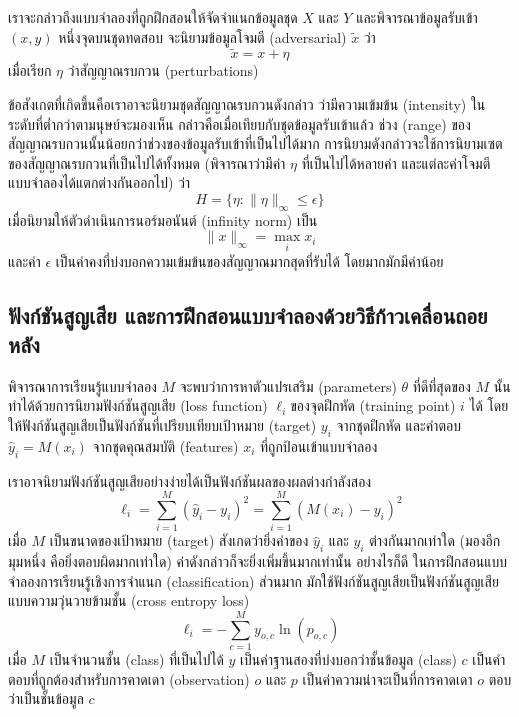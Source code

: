\documentclass{cpepaper}
\begin{document}
เราจะกล่าวถึงแบบจำลองที่ถูกฝึกสอนให้จัดจำแนกข้อมูลชุด $X$ และ $Y$ และพิจารณาข้อมูลรับเข้า $(x, y)$ หนึ่งจุดบนชุดทดสอบ จะนิยามข้อมูลโจมตี (adversarial) $\tilde{x}$ ว่า
\begin{equation}
    \tilde{x} = x + \eta
\end{equation}
เมื่อเรียก $\eta$ ว่าสัญญาณรบกวน (perturbations)

ข้อสังเกตที่เกิดขึ้นคือเราอาจะนิยามชุดสัญญาณรบกวนดังกล่าว ว่ามีความเข้มข้น (intensity) ในระดับที่ต่ำกว่าตามนุษย์จะมองเห็น กล่าวคือเมื่อเทียบกับชุดข้อมูลรับเข้าแล้ว ช่วง (range) ของสัญญาณรบกวนนั้นน้อยกว่าช่วงของข้อมูลรับเข้าที่เป็นไปได้มาก การนิยามดังกล่าวจะใช้การนิยามเซตของสัญญาณรบกวนที่เป็นไปได้ทั้งหมด (พิจารณาว่ามีค่า $\eta$ ที่เป็นไปได้หลายค่า และแต่ละค่าโจมตีแบบจำลองได้แตกต่างกันออกไป) ว่า
\begin{equation}
    H = \{ \eta: \|\eta\|_\infty \leq \epsilon\}
    \label{perturbation-set}
\end{equation}
เมื่อนิยามให้ตัวดำเนินการนอร์มอนันต์ (infinity norm) เป็น
\begin{equation}
    \|x\|_\infty = \max_i{x_i}
\end{equation}
และค่า $\epsilon$ เป็นค่าคงที่บ่งบอกความเข้มข้นของสัญญาณมากสุดที่รับได้ โดยมากมักมีค่าน้อย

\subsection{ฟังก์ชันสูญเสีย และการฝึกสอนแบบจำลองด้วยวิธีก้าวเคลื่อนถอยหลัง}
พิจารณาการเรียนรู้แบบจำลอง $M$ จะพบว่าการหาตัวแปรเสริม (parameters) $\theta$ ที่ดีที่สุดของ $M$ นั้นทำได้ด้วยการนิยามฟังก์ชันสูญเสีย (loss function) $\ell_i $ของจุดฝึกหัด (training point) $i$ ได้ โดยให้ฟังก์ชันสูญเสียเป็นฟังก์ชันที่เปรียบเทียบเป้าหมาย (target) $y_i$ จากชุดฝึกหัด และคำตอบ $\hat{y}_i = M(x_i)$ จากชุดคุณสมบัติ (features) $x_i$ ที่ถูกป้อนเข้าแบบจำลอง

เราอาจนิยามฟังก์ชันสูญเสียอย่างง่ายได้เป็นฟังก์ชันผลของผลต่างกำลังสอง
\begin{equation}
    \ell_i = \sum_{i=1}^{M}{(\hat{y}_i - y_i)^2} = \sum_{i=1}^{M}{(M(x_i) - y_i)^2}
    \label{mse-loss}
\end{equation}
เมื่อ $M$ เป็นขนาดของเป้าหมาย (target) สังเกดว่ายิ่งค่าของ $\hat{y}_i$ และ $y_i$ ต่างกันมากเท่าใด (มองอีกมุมหนึ่ง คือยิ่งตอบผิดมากเท่าใด) ค่าดังกล่าวก็จะยิ่งเพิ่มขึ้นมากเท่านั้น อย่างไรก็ดี ในการฝึกสอนแบบจำลองการเรียนรู้เชิงการจำแนก (classification) ส่วนมาก มักใช้ฟังก์ชันสูญเสียเป็นฟังก์ชันสูญเสียแบบความวุ่นวายข้ามชั้น (cross entropy loss)
\begin{equation}
    \ell_i = -\sum_{c=1}^{M}y_{o,c}\ln(p_{o,c})
    \label{cross-entropy-loss}
\end{equation}
เมื่อ $M$ เป็นจำนวนชั้น (class) ที่เป็นไปได้ $y$ เป็นค่าฐานสองที่บ่งบอกว่าชั้นข้อมูล (class) $c$ เป็นคำตอบที่ถูกต้องสำหรับการคาดเดา (observation) $o$ และ $p$ เป็นค่าความน่าจะเป็นที่การคาดเดา $o$ ตอบว่าเป็นชั้นข้อมูล $c$
\end{document}
